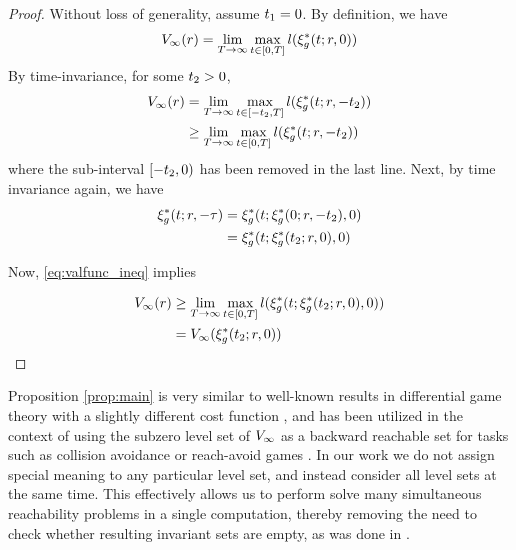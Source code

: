 \begin{proof}
Without loss of generality, assume $t_1=0$. By definition, we have
\begin{equation}
\begin{aligned}
V_\infty(r) & = \lim_{T\rightarrow\infty}\max_{t \in [0, T]} l(\xi_g^*(t; r, 0))\\
\end{aligned}
\end{equation}
By time-invariance, for some $t_2 > 0$,
\begin{equation}
\label{eq:valfunc_ineq}
  \begin{aligned}
V_\infty(r) &= \lim_{T\rightarrow\infty}\max_{t \in [-t_2, T]} l(\xi_g^*(t; r, -t_2)) \\
&\ge \lim_{T\rightarrow\infty}\max_{t \in [0, T]} l(\xi_g^*(t; r, -t_2)) 
  \end{aligned}
\end{equation}  
\noindent where the sub-interval $[-t_2, 0)$ has been removed in the last line. Next, by time invariance again, we  have
\begin{equation}
\begin{aligned}
\xi_g^*(t; r, -\tau) &= \xi_g^*(t; \xi_g^*(0; r, -t_2), 0) \\
&= \xi_g^*(t; \xi_g^*(t_2; r, 0), 0)
\end{aligned}
\end{equation}

Now, \eqref{eq:valfunc_ineq} implies

\begin{equation}
\begin{aligned}
V_\infty(r) &\ge \lim_{T\rightarrow\infty}\max_{t \in [0, T]} l(\xi_g^*(t; \xi_g^*(t_2; r, 0), 0)) \\
&= V_\infty(\xi_g^*(t_2; r, 0))
\end{aligned}
\end{equation} 
\end{proof} 
 \begin{rem} 
   Proposition \ref{prop:main} is very similar to well-known results in differential game theory with a slightly different cost function \cite{Akametalu2014}, and has been utilized in the context of using the subzero level set of $V_\infty$ as a backward reachable set for tasks such as collision avoidance or reach-avoid games \cite{Mitchell05}. In our work we do not assign special meaning to any particular level set, and instead consider all level sets at the same time. This effectively allows us to perform solve many simultaneous reachability problems in a single computation, thereby removing the need to check whether resulting invariant sets are empty, as was done in \cite{Bansal2017}.
 \end{rem}